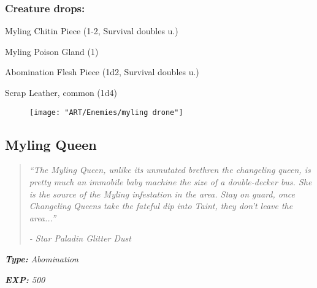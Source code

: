 \documentclass[11pt,a4paper,twocolumn]{book}
\begin{document}
	\subsubsection*{Creature drops:}
	\begin{compactitem}
		\item Myling Chitin Piece (1-2, Survival doubles u.)
		\item Myling Poison Gland (1)
		\item Abomination Flesh Piece (1d2, Survival doubles u.)
		\item Scrap Leather, common (1d4)
	\end{compactitem}
	
	\begin{figure}[h]
		\centering
		\texttt{[image: "ART/Enemies/myling drone"]}
	\end{figure}
	
	\clearpage
	\subsection*{Myling Queen}
	
	\begin{quote}
		\emph{``The Myling Queen, unlike its unmutated brethren the changeling queen, is pretty much an immobile baby machine the size of a double-decker bus. She is the source of the Myling infestation in the area. Stay on guard, once Changeling Queens take the fateful dip into Taint, they don't leave the area...''}
		
		\emph{-	Star Paladin Glitter Dust}
	\end{quote}
	
	\noindent
	\emph{\textbf{Type:} Abomination}
	
	\noindent
	\emph{\textbf{EXP:} 500}
	
%		
%	
%		
	
\end{document}
